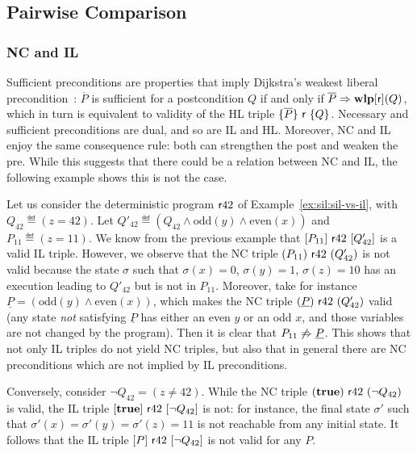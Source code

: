 \subsection{Pairwise Comparison}
\subsubsection{NC and IL}
Sufficient preconditions are properties that imply Dijkstra's weakest liberal precondition~\cite{Dijkstra75}: $\overline{P}$ is sufficient for a postcondition $Q$ if and only if $\overline{P} \Rightarrow \textbf{wlp}[\mathsf{r}](Q)$, which in turn is equivalent to validity of the HL triple $\{\overline{P}\}~\mathsf{r}~\{Q\}$. Necessary and sufficient preconditions are dual, and so are IL and HL. Moreover, NC and IL enjoy the same consequence rule: both can strengthen the post and weaken the pre. While this suggests that there could be a relation between NC and IL, the following example shows this is not the case.

\begin{example}
	Let us consider the deterministic program $\mathsf{r} 42$ of Example~\ref{ex:sil:sil-vs-il}, with $Q_{42} \eqdef (z=42)$.
	Let $Q'_{42} \eqdef (Q_{42} \wedge \text{odd}(y) \wedge \text{even}(x))$ and $P_{11} \eqdef (z = 11)$. We know from the previous example that $[P_{11}]~\mathsf{r} 42~[Q'_{42}]$ is a valid IL triple.
	However, we observe that the NC triple $(P_{11})~\mathsf{r} 42~(Q'_{42})$ is not valid because the state $\sigma$ such that $\sigma(x) = 0$, $\sigma(y) = 1$, $\sigma(z) = 10$ has an execution leading to $Q'_{42}$ but is not in $P_{11}$.
	Moreover, take for instance $\underline{P} = (\text{odd}(y) \land \text{even}(x))$, which makes the NC triple $(\underline{P})~\mathsf{r} 42~(Q'_{42})$ valid (any state \emph{not} satisfying $\underline{P}$ has either an even $y$ or an odd $x$, and those variables are not changed by the program). Then it is clear that $P_{11} \notimplies \underline{P}$. This shows that not only IL triples do not yield NC triples, but also that in general there are NC preconditions which are not implied by IL preconditions.

	Conversely, consider $\neg Q_{42} = (z \neq 42)$. While the NC triple $(\textbf{true})~\mathsf{r} 42~(\neg Q_{42})$ is valid, the IL triple $[\textbf{true}]~\mathsf{r} 42~[\neg Q_{42}]$ is not: for instance, the final state $\sigma'$ such that $\sigma'(x) = \sigma'(y) = \sigma'(z) = 11$ is not reachable from any initial state. It follows that the IL triple $[P]~\mathsf{r} 42~[\neg Q_{42}]$ is not valid for any $P$.
\end{example}

